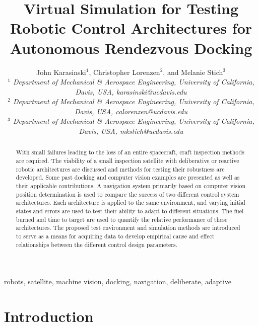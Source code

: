 \documentclass[journal, 10pt]{IEEEtran}
\begin{document}
\title{Virtual Simulation for Testing Robotic Control Architectures for Autonomous Rendezvous Docking }

\author{John Karasinski$^1$, Christopher Lorenzen$^2$, and Melanie Stich$^3$\\\textit{$^1$ Department of Mechanical \& Aerospace Engineering, University of California, Davis, USA, karasinski@ucdavis.edu}
\\\textit{$^2$ Department of Mechanical \& Aerospace Engineering, University of California, Davis, USA, calorenzen@ucdavis.edu}\\\textit{$^3$ Department of Mechanical \& Aerospace Engineering, University of California, Davis, USA, mkstich@ucdavis.edu}
}

\maketitle

\begin{abstract}
With small failures leading to the loss of an entire spacecraft, craft inspection methods are required.  The viability of a small inspection satellite with deliberative or reactive robotic architectures are discussed and methods for testing their robustness are developed.  Some past docking and computer vision examples are presented as well as their applicable contributions.  A navigation system primarily based on computer vision position determination is used to compare the success of two different control system architectures.  Each architecture is applied to the same environment, and varying initial states and errors are used to test their ability to adapt to different situations.  The fuel burned and time to target are used to quantify the relative performance of these architectures.  The proposed test environment and simulation methods are introduced to serve as a means for acquiring data to develop empirical cause and effect relationships between the different control design parameters.
\end{abstract}

\begin{IEEEkeywords}
robots, satellite, machine vision, docking, navigation, deliberate, adaptive
\end{IEEEkeywords}


\section{Introduction}
\end{document}
